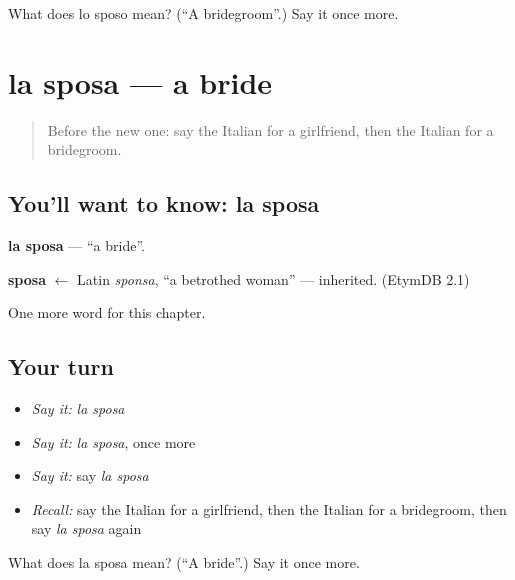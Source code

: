 \begin{tcolorbox}[breakable,colback=teal!4,colframe=teal!35!black,title={Before you move on}]
What does lo sposo mean? (\textquotedblleft{}A bridegroom\textquotedblright{}.) Say it once more.
\end{tcolorbox}
\section[la sposa]{la sposa — a bride}

\label{lesson:IT-C164-sposa}



\begin{quote}
Before the new one: say the Italian for a girlfriend, then the Italian for a bridegroom.
\end{quote}

\subsection*{You'll want to know: la sposa}
\textbf{la sposa} — \textquotedblleft{}a bride\textquotedblright{}.

\begin{cousinweb}
\textbf{sposa} $\leftarrow$ Latin \emph{sponsa}, \textquotedblleft{}a betrothed woman\textquotedblright{} — inherited. (EtymDB 2.1)
\end{cousinweb}

\begin{grammarlens}[title={What you've built}]
One more word for this chapter.
\end{grammarlens}

\subsection*{Your turn}
\begin{itemize}
\raggedright
  \item \emph{Say it:} \emph{la sposa}
  \item \emph{Say it:} \emph{la sposa}, once more
  \item \emph{Say it:} say \emph{la sposa}
  \item \emph{Recall:} say the Italian for a girlfriend, then the Italian for a bridegroom, then say \emph{la sposa} again
\end{itemize}

\begin{tcolorbox}[breakable,colback=teal!4,colframe=teal!35!black,title={Before you move on}]
What does la sposa mean? (\textquotedblleft{}A bride\textquotedblright{}.) Say it once more.
\end{tcolorbox}
